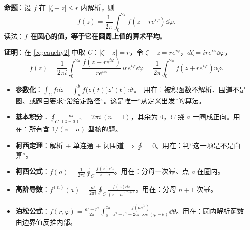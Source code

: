 \documentclass[11pt]{ctexart}
\let\origsubhdr\subhdr
\renewcommand{\subhdr}[1]{\par\needspace{4\baselineskip}\origsubhdr{#1}}
\let\orighdr\hdr
\renewcommand{\hdr}[2]{\par\needspace{9\baselineskip}\orighdr{#1}{#2}}
\begin{document}


\textbf{命题}：设 $f$ 在 $|\zeta-z|\le r$ 内解析，则
\begin{equation}\label{eq:mean}
f(z)=\frac{1}{2\pi}\int_0^{2\pi}f(z+re^{i\varphi})\dd\varphi .
\end{equation}
读法：\textbf{$f$ 在圆心的值，等于它在圆周上值的算术平均}。

\textbf{证明}：在 \eqref{eq:cauchy2} 中取 $C$：$|\zeta-z|=r$，令 $\zeta-z=re^{i\varphi}$，$d\zeta=ire^{i\varphi}\dd\varphi$，
\[ f(z)=\frac{1}{2\pi i}\int_0^{2\pi}\frac{f(z+re^{i\varphi})}{re^{i\varphi}}\,ire^{i\varphi}\dd\varphi
=\frac{1}{2\pi}\int_0^{2\pi}f(z+re^{i\varphi})\dd\varphi . \]


\flowerrule



\begin{itemize}
\item[\textbf{F1}] \textbf{参数化}：$\displaystyle\int_C f\dd z=\int_a^b f\bigl(z(t)\bigr)z'(t)\dd t$。\ 用在：被积函数不解析、围道不是圆、或题目要求“沿给定路径”。这是唯一“从定义出发”的算法。
\item[\textbf{F2}] \textbf{基本积分}：$\displaystyle\oint_C\frac{dz}{(z-a)^{n}}=2\pi i\,(n=1)$，其余为 $0$，$C$ 绕 $a$ 一圈成正向。用在：所有含 $1/(z-a)$ 型核的题。
\item[\textbf{F3}] \textbf{柯西定理}：解析 + 单连通 + 闭围道 $\Rightarrow\oint=0$。用在：判“这一项是不是白算”。
\item[\textbf{F4}] \textbf{柯西公式}：$\displaystyle f(a)=\frac{1}{2\pi i}\oint_C\frac{f(z)\dd z}{z-a}$。用在：分母一次幂、点 $a$ 在圈内。
\item[\textbf{F5}] \textbf{高阶导数}：$\displaystyle f^{(n)}(a)=\frac{n!}{2\pi i}\oint_C\frac{f(z)\dd z}{(z-a)^{n+1}}$。用在：分母 $n+1$ 次幂。
\item[\textbf{F6}] \textbf{泊松公式}：$\displaystyle f(r,\varphi)=\frac{a^{2}-r^{2}}{2\pi}\int_0^{2\pi}\frac{f(ae^{i\theta})}{a^{2}+r^{2}-2ar\cos(\varphi-\theta)}\dd\theta$。用在：圆内解析函数由边界值反推内部。
\end{itemize}
\end{document}
